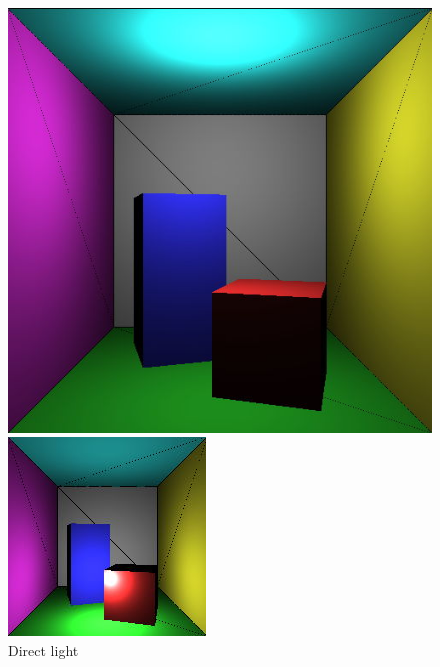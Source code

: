 \begin{figure}[H]
    \centering
    \includegraphics[width=\linewidth]{img/light_col1.jpg}
    \caption{Direct light}
\endminipage\hfill
{}
    \centering
    \includegraphics[width=\linewidth]{img/light_col2.jpg}

\end{figure}
